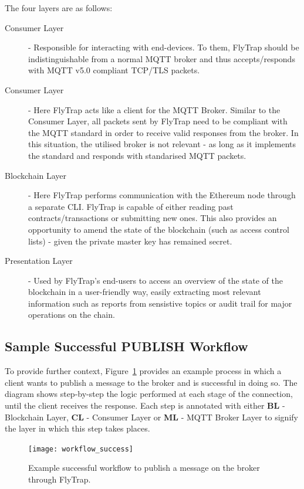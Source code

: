 The four layers are as follows:
\begin{description}
    \item[Consumer Layer] - Responsible for interacting with end-devices. To them, FlyTrap should be indistinguishable from a normal MQTT broker and thus accepts/responds with MQTT v5.0 compliant TCP/TLS packets. 
    \item[Consumer Layer] - Here FlyTrap acts like a client for the MQTT Broker. Similar to the Consumer Layer, all packets sent by FlyTrap need to be compliant with the MQTT standard in order to receive valid responses from the broker. In this situation, the utilised broker is not relevant - as long as it implements the standard and responds with standarised MQTT packets.
    \item[Blockchain Layer] - Here FlyTrap performs communication with the Ethereum node through a separate CLI. FlyTrap is capable of either reading past contracts/transactions or submitting new ones. This also provides an opportunity to amend the state of the blockchain (such as access control lists) - given the private master key has remained secret.
    \item[Presentation Layer] - Used by FlyTrap's end-users to access an overview of the state of the blockchain in a user-friendly way, easily extracting most relevant information such as reports from sensistive topics or audit trail for major operations on the chain.
\end{description}


\subsection{Sample Successful PUBLISH Workflow}
To provide further context, Figure~\ref{fig:workflow_success} provides an example process in which a client wants to publish a message to the broker and is successful in doing so. The diagram shows step-by-step the logic performed at each stage of the connection, until the client receives the response. Each step is annotated with either \textbf{BL} - Blockchain Layer, \textbf{CL} - Consumer Layer or \textbf{ML} - MQTT Broker Layer to signify the layer in which this step takes places.
\begin{figure}[h]
    \centering
    \texttt{[image: workflow\_success]}
    \caption{Example successful workflow to publish a message on the broker through FlyTrap.}
    \label{fig:workflow_success}
\end{figure}

